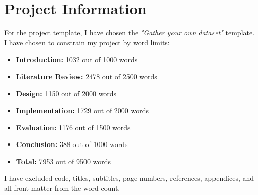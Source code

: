 
{}

\vspace*{3cm}

\begingroup
\chapter*{Project Information}

For the project template, I have chosen the \emph{"Gather your own dataset"} template. 
I have chosen to constrain my project by word limits:

\begin{itemize}
    \item \textbf{Introduction:} 1032 out of 1000 words
    \item \textbf{Literature Review:} 2478 out of 2500 words
    \item \textbf{Design:} 1150 out of 2000 words
    \item \textbf{Implementation:} 1729 out of 2000 words
    \item \textbf{Evaluation:} 1176 out of 1500 words
    \item \textbf{Conclusion:} 388 out of 1000 words
    \item \textbf{Total:} 7953 out of 9500 words
\end{itemize}

I have excluded code, titles, subtitles, page numbers, references, appendices, and all front matter from the word count.


\endgroup

